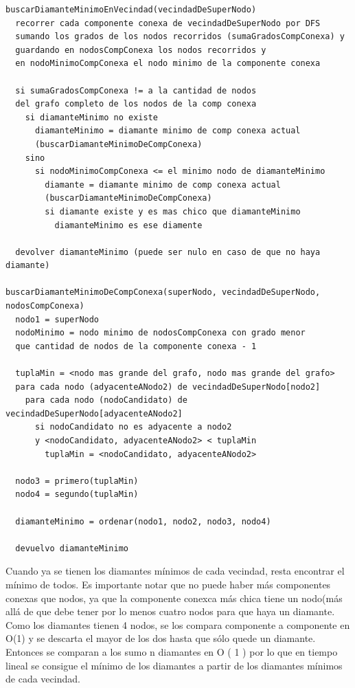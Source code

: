 \documentclass[a4paper,11pt] {article}
\begin{document}
\begin{verbatim}
buscarDiamanteMinimoEnVecindad(vecindadDeSuperNodo)
  recorrer cada componente conexa de vecindadDeSuperNodo por DFS
  sumando los grados de los nodos recorridos (sumaGradosCompConexa) y
  guardando en nodosCompConexa los nodos recorridos y
  en nodoMinimoCompConexa el nodo minimo de la componente conexa

  si sumaGradosCompConexa != a la cantidad de nodos
  del grafo completo de los nodos de la comp conexa
    si diamanteMinimo no existe
      diamanteMinimo = diamante minimo de comp conexa actual 
      (buscarDiamanteMinimoDeCompConexa)
    sino
      si nodoMinimoCompConexa <= el minimo nodo de diamanteMinimo
        diamante = diamante minimo de comp conexa actual 
        (buscarDiamanteMinimoDeCompConexa)
        si diamante existe y es mas chico que diamanteMinimo
          diamanteMinimo es ese diamente

  devolver diamanteMinimo (puede ser nulo en caso de que no haya diamante)

buscarDiamanteMinimoDeCompConexa(superNodo, vecindadDeSuperNodo, nodosCompConexa)
  nodo1 = superNodo
  nodoMinimo = nodo minimo de nodosCompConexa con grado menor 
  que cantidad de nodos de la componente conexa - 1

  tuplaMin = <nodo mas grande del grafo, nodo mas grande del grafo>
  para cada nodo (adyacenteANodo2) de vecindadDeSuperNodo[nodo2]
    para cada nodo (nodoCandidato) de vecindadDeSuperNodo[adyacenteANodo2]
      si nodoCandidato no es adyacente a nodo2 
      y <nodoCandidato, adyacenteANodo2> < tuplaMin
        tuplaMin = <nodoCandidato, adyacenteANodo2>

  nodo3 = primero(tuplaMin)
  nodo4 = segundo(tuplaMin)

  diamanteMinimo = ordenar(nodo1, nodo2, nodo3, nodo4)

  devuelvo diamanteMinimo

\end{verbatim}

Cuando ya se tienen los diamantes mínimos de cada vecindad, resta encontrar el mínimo de todos.
Es importante notar que no puede haber más componentes conexas que nodos, ya que la componente conexca más chica tiene un nodo(más allá de que debe tener por lo menos cuatro nodos para que haya un diamante.
Como los diamantes tienen 4 nodos, se los compara componente a componente en O(1) y se descarta el mayor de los dos hasta que sólo quede un diamante. Entonces se comparan a los sumo n diamantes en O ( 1 ) por lo que en tiempo lineal se consigue el mínimo de los diamantes a partir de los diamantes mínimos de cada vecindad.
\end{document}
